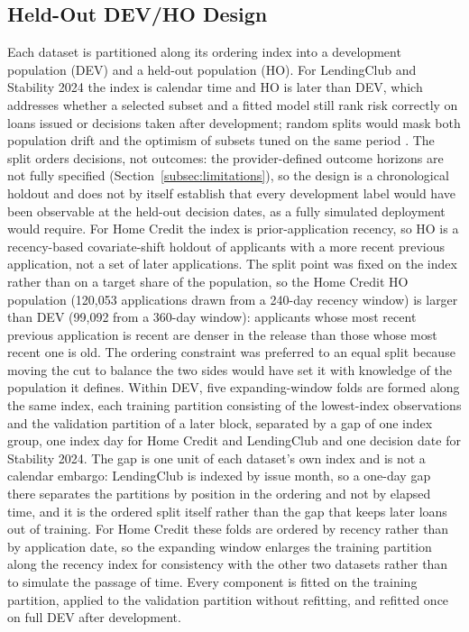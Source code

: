\documentclass[final,5p,twocolumn]{elsarticle}
\begin{document}
\subsection{Held-Out DEV/HO Design}
\label{subsec:dev_oot}

Each dataset is partitioned along its ordering index into a development population (DEV) and a held-out population (HO). For LendingClub and Stability 2024 the index is calendar time and HO is later than DEV, which addresses whether a selected subset and a fitted model still rank risk correctly on loans issued or decisions taken after development; random splits would mask both population drift and the optimism of subsets tuned on the same period \cite{bergmeir2012,gama2014}. The split orders decisions, not outcomes: the provider-defined outcome horizons are not fully specified (Section~\ref{subsec:limitations}), so the design is a chronological holdout and does not by itself establish that every development label would have been observable at the held-out decision dates, as a fully simulated deployment would require. For Home Credit the index is prior-application recency, so HO is a recency-based covariate-shift holdout of applicants with a more recent previous application, not a set of later applications. The split point was fixed on the index rather than on a target share of the population, so the Home Credit HO population (120,053 applications drawn from a 240-day recency window) is larger than DEV (99,092 from a 360-day window): applicants whose most recent previous application is recent are denser in the release than those whose most recent one is old. The ordering constraint was preferred to an equal split because moving the cut to balance the two sides would have set it with knowledge of the population it defines. Within DEV, five expanding-window folds are formed along the same index, each training partition consisting of the lowest-index observations and the validation partition of a later block, separated by a gap of one index group, one index day for Home Credit and LendingClub and one decision date for Stability 2024. The gap is one unit of each dataset's own index and is not a calendar embargo: LendingClub is indexed by issue month, so a one-day gap there separates the partitions by position in the ordering and not by elapsed time, and it is the ordered split itself rather than the gap that keeps later loans out of training. For Home Credit these folds are ordered by recency rather than by application date, so the expanding window enlarges the training partition along the recency index for consistency with the other two datasets rather than to simulate the passage of time. Every component is fitted on the training partition, applied to the validation partition without refitting, and refitted once on full DEV after development.
\end{document}
